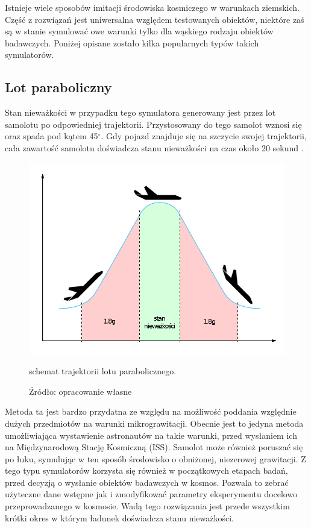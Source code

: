 Istnieje wiele sposobów imitacji środowiska kosmiczego w warunkach ziemskich. Część z
 rozwiązań jest uniwersalna względem testowanych obiektów, niektóre zaś są w stanie
  symulować owe warunki tylko dla wąskiego rodzaju obiektów badawczych. Poniżej opisane
   zostało kilka popularnych typów takich symulatorów.

\subsection{Lot paraboliczny}

Stan nieważkości w przypadku tego symulatora generowany jest przez lot samolotu po
 odpowiedniej trajektorii. Przystosowany do tego samolot wznosi się oraz spada pod kątem
  45$^\circ$. Gdy pojazd znajduje się na szczycie swojej trajektorii, cała zawartość
   samolotu doświadcza stanu nieważkości na czas około 20 sekund
    \cite{bib:lot_paraboliczny}. 

\begin{figure}[h]
	
	\centering
	
	
	\includegraphics[scale=1.3]{lot_para_sch.jpg}
	\caption{schemat trajektorii lotu parabolicznego.}
	\caption*{Źródło: opracowanie własne}
	\label{fig_paraboliczny}
	
\end{figure}

Metoda ta jest bardzo przydatna ze względu na możliwość poddania względnie dużych
 przedmiotów na warunki mikrograwitacji. Obecnie jest to jedyna metoda umożliwiająca
  wystawienie astronautów na takie warunki, przed wysłaniem ich na Międzynarodową Stację
   Kosmiczną (ISS)\cite{bib:lot_paraboliczny}. Samolot może również poruszać się po
    łuku, symulując w ten sposób środowisko o obniżonej, niezerowej grawitacji. Z tego
     typu symulatorów korzysta się również w początkowych etapach badań, przed decyzją o
      wysłanie obiektów badawczych w kosmos. Pozwala to zebrać użyteczne dane wstępne
       jak i zmodyfikować parametry eksperymentu docelowo przeprowadzanego w kosmosie.
        Wadą tego rozwiązania jest przede wszystkim krótki okres w którym ładunek
         doświadcza stanu nieważkości.

